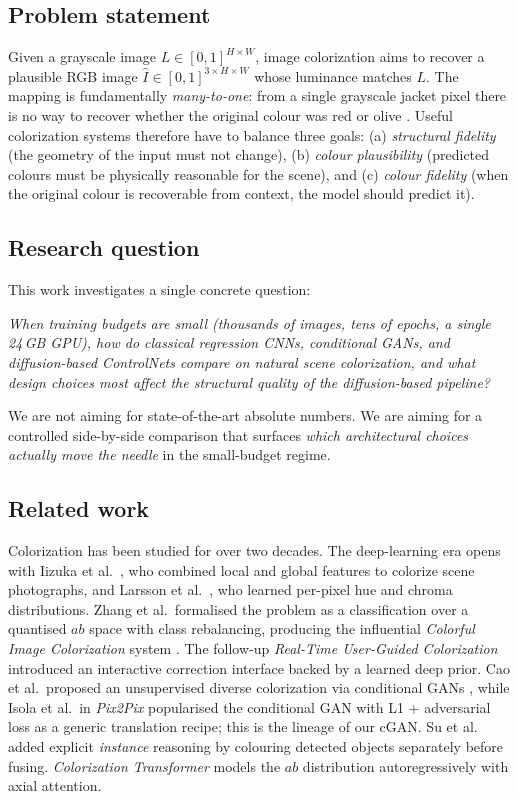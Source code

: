 \documentclass[conference]{IEEEtran}
\begin{document}
\subsection{Problem statement}
Given a grayscale image $L\in[0,1]^{H\times W}$, image colorization
aims to recover a plausible RGB image $\hat{I}\in[0,1]^{3\times H\times W}$
whose luminance matches $L$. The mapping is fundamentally
\emph{many-to-one}: from a single grayscale jacket pixel there is no way
to recover whether the original colour was red or olive
\cite{zhang2016colorful}. Useful colorization systems therefore have to
balance three goals: (a) \emph{structural fidelity} (the geometry of the
input must not change), (b) \emph{colour plausibility} (predicted
colours must be physically reasonable for the scene), and (c)
\emph{colour fidelity} (when the original colour is recoverable from
context, the model should predict it).

\subsection{Research question}
This work investigates a single concrete question:

\medskip
\emph{When training budgets are small (thousands of images, tens of
epochs, a single 24\,GB GPU), how do classical regression CNNs,
conditional GANs, and diffusion-based ControlNets compare on natural
scene colorization, and what design choices most affect the structural
quality of the diffusion-based pipeline?}
\medskip

We are not aiming for state-of-the-art absolute numbers. We are aiming
for a controlled side-by-side comparison that surfaces \emph{which
architectural choices actually move the needle} in the small-budget
regime.

\subsection{Related work}\label{sec:related}
Colorization has been studied for over two decades. The deep-learning
era opens with Iizuka et al.\ \cite{iizuka2016letthere}, who combined
local and global features to colorize scene photographs, and Larsson
et al.\ \cite{larsson2016learning}, who learned per-pixel hue and
chroma distributions. Zhang et al.\ formalised the problem as a
classification over a quantised $ab$ space with class rebalancing,
producing the influential \emph{Colorful Image Colorization} system
\cite{zhang2016colorful}. The follow-up \emph{Real-Time User-Guided
Colorization} \cite{zhang2017realtime} introduced an interactive
correction interface backed by a learned deep prior. Cao et al.\
proposed an unsupervised diverse colorization via conditional GANs
\cite{cao2017unsupervised}, while Isola et al.\ in \emph{Pix2Pix}
\cite{isola2017image} popularised the conditional GAN with L1 +
adversarial loss as a generic translation recipe; this is the lineage
of our cGAN. Su et al.\ \cite{su2020instance} added explicit
\emph{instance} reasoning by colouring detected objects separately
before fusing. \emph{Colorization Transformer}
\cite{kumar2021colorization} models the $ab$ distribution autoregressively
with axial attention.
\end{document}

